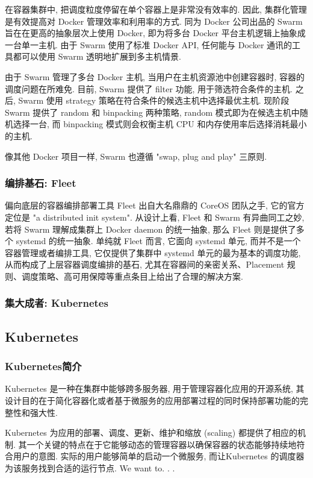 \documentclass[UTF8,a4paper]{ctexart}
\begin{document}
在容器集群中, 把调度粒度停留在单个容器上是非常没有效率的. 因此, 集群化管理是有效提高对 Docker 管理效率和利用率的方式. 同为 Docker 公司出品的 Swarm\cite{Docker-swarm} 旨在在更高的抽象层次上使用 Docker, 即为将多台 Docker 平台主机逻辑上抽象成一台单一主机. 由于 Swarm 使用了标准 Docker API, 任何能与 Docker 通讯的工具都可以使用 Swarm 透明地扩展到多主机情景.

由于 Swarm 管理了多台 Docker 主机, 当用户在主机资源池中创建容器时, 容器的调度问题在所难免. 目前, Swarm 提供了 filter 功能, 用于筛选符合条件的主机. 之后, Swarm 使用 strategy 策略在符合条件的候选主机中选择最优主机. 现阶段 Swarm 提供了 random 和 binpacking 两种策略, random 模式即为在候选主机中随机选择一台, 而 binpacking 模式则会权衡主机 CPU 和内存使用率后选择消耗最小的主机.

像其他 Docker 项目一样, Swarm 也遵循 "swap, plug and play" 三原则.

\subsubsection{编排基石: Fleet}
偏向底层的容器编排部署工具 Fleet\cite{CoreOS-fleet} 出自大名鼎鼎的 CoreOS 团队之手, 它的官方定位是 "a distributed init system". 从设计上看, Fleet 和 Swarm 有异曲同工之妙, 若将 Swarm 理解成集群上 Docker daemon 的统一抽象, 那么 Fleet 则是提供了多个 systemd 的统一抽象. 单纯就 Fleet 而言, 它面向 systemd 单元, 而并不是一个容器管理或者编排工具, 它仅提供了集群中 systemd 单元的最为基本的调度功能, 从而构成了上层容器调度编排的基石, 尤其在容器间的亲密关系、Placement 规则、调度策略、高可用保障等重点条目上给出了合理的解决方案.

\subsubsection{集大成者: Kubernetes}

\subsection{Kubernetes}
\subsubsection{Kubernetes简介}
Kubernetes 是一种在集群中能够跨多服务器, 用于管理容器化应用的开源系统, 其设计目的在于简化容器化或者基于微服务的应用部署过程的同时保持部署功能的完整性和强大性.

Kubernetes 为应用的部署、调度、更新、维护和缩放 (scaling) 都提供了相应的机制. 其一个关键的特点在于它能够动态的管理容器以确保容器的状态能够持续地符合用户的意图. 实际的用户能够简单的启动一个微服务, 而让Kubernetes 的调度器为该服务找到合适的运行节点. We want to. . .
\end{document}
